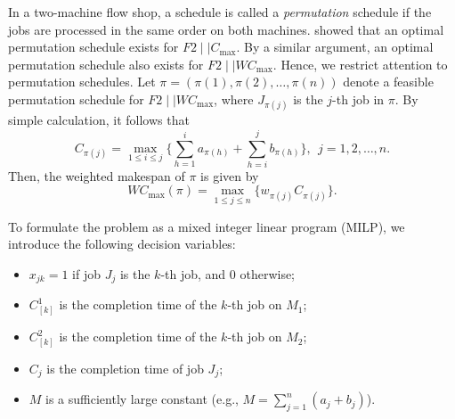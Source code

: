 \documentclass[12pt]{article}
\begin{document}
\begin{sloppypar}
        In a two-machine flow shop, a schedule is called a \textit{permutation} schedule if the jobs are processed in the same order on both machines. \cite{Johnson1954NRL} showed that an optimal permutation schedule exists for $F2 \mid \mid C_{\max}$. By a similar argument, an optimal permutation schedule also exists for $F2 \mid \mid WC_{\max}$. Hence, we restrict  attention to permutation schedules. Let $\pi = (\pi(1), \pi(2), \ldots, \pi(n))$ denote a feasible permutation schedule for $F2 \mid \mid W C_{\max}$, where $J_{\pi(j)}$ is the $j$-th job in $\pi$. By simple calculation, it follows that 
        \begin{equation}\label{eq:completion}
            C_{\pi(j)} = \max_{1 \leq i \leq j} \Big\{\sum_{h=1}^{i}a_{\pi(h)} + \sum_{h=i}^{j}b_{\pi(h)} \Big\}, ~~ j=1, 2, \ldots, n.
        \end{equation}
        Then, the weighted makespan of $\pi$ is given by 
        \begin{equation}\label{eq:wcmax}
            W C_{\max}(\pi)=\max_{1 \leq j \leq n}\{ w_{\pi(j)} C_{\pi(j)}\}.
        \end{equation}
        
        To formulate the problem as a mixed integer linear program (MILP), we introduce the following decision variables:
        \begin{itemize}
            \item $x_{jk} = 1$ if job $J_j$ is the $k$-th job, and $0$ otherwise;
            
            \item $C_{[k]}^1$ is the completion time of the $k$-th job on $M_1$;
            
            \item $C_{[k]}^2$ is the completion time of the $k$-th job on $M_2$;
            
            \item $C_j$ is the completion time of job $J_j$;
            
            \item $M$ is a sufficiently large constant (e.g., $M=\sum_{j=1}^{n}(a_j + b_j)$).
        \end{itemize}
        

\end{sloppypar}
\end{document}
